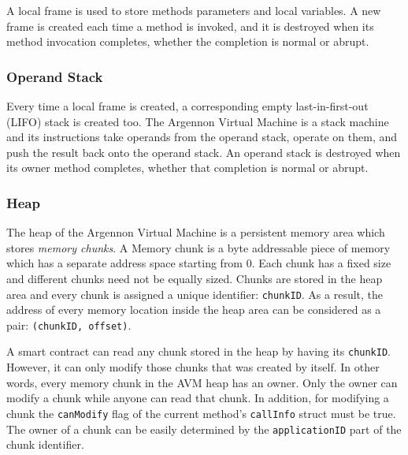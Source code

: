 A local frame is used to store methods parameters and local variables. A new frame is created each time a method
is invoked, and it is destroyed when its method invocation completes, whether the completion is normal or abrupt.

\subsubsection{Operand Stack}

Every time a local frame is created, a corresponding empty last-in-first-out (LIFO) stack is created too. The
Argennon Virtual Machine is a stack machine and its instructions take operands from the operand stack, operate on
them, and push the result back onto the operand stack. An operand stack is destroyed when its owner method
completes, whether that completion is normal or abrupt.

\subsubsection{Heap}

The heap of the Argennon Virtual Machine is a persistent memory area which stores \emph{memory chunks}. A Memory
chunk is a byte addressable piece of memory which has a separate address space starting from 0. Each chunk has a
fixed size and different chunks need not be equally sized. Chunks are stored in the heap area and every chunk is
assigned a unique identifier: \texttt{chunkID}. As a result, the address of every memory location inside
the heap area can be considered as a pair: \texttt{(chunkID, offset)}.

A smart contract can read any chunk stored in the heap by having its \texttt{chunkID}. However, it can only modify
those chunks that was created by itself. In other words, every memory chunk in the AVM heap has an owner. Only
the owner can modify a chunk while anyone can read that chunk. In addition, for modifying a chunk the \texttt{canModify}
flag of the current method's \texttt{callInfo} struct must be true. The owner of a chunk can be easily determined
by the \texttt{applicationID} part of the chunk identifier.


